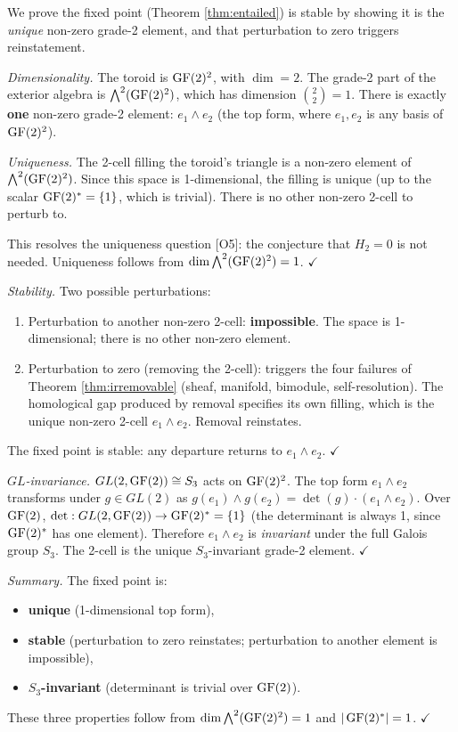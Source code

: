 We prove the fixed point (Theorem \ref{thm:entailed})
is stable by showing it is the \emph{unique} non-zero
grade-2 element, and that perturbation to zero triggers
reinstatement.

\emph{Dimensionality.}
The toroid is $\operatorname{GF}(2)^2$, with $\dim = 2$. The grade-2
part of the exterior algebra is
$\bigwedge^2(\operatorname{GF}(2)^2)$, which has dimension
$\binom{2}{2} = 1$. There is exactly \textbf{one}
non-zero grade-2 element: $e_1 \wedge e_2$ (the top
form, where $e_1, e_2$ is any basis of $\operatorname{GF}(2)^2$).

\emph{Uniqueness.}
The 2-cell filling the toroid's triangle is a non-zero
element of $\bigwedge^2(\operatorname{GF}(2)^2)$. Since this space is
1-dimensional, the filling is unique (up to the scalar
$\operatorname{GF}(2)^* = \{1\}$, which is trivial). There is no
other non-zero 2-cell to perturb to.

This resolves the uniqueness question [O5]: the
conjecture that $H_2 = 0$ is not needed. Uniqueness
follows from $\dim \bigwedge^2(\operatorname{GF}(2)^2) = 1$.
$\checkmark$

\emph{Stability.}
Two possible perturbations:
\begin{enumerate}[label=(\roman*),nosep]
  \item Perturbation to another non-zero 2-cell:
    \textbf{impossible}. The space is 1-dimensional;
    there is no other non-zero element.
  \item Perturbation to zero (removing the 2-cell):
    triggers the four failures of Theorem
    \ref{thm:irremovable} (sheaf, manifold, bimodule,
    self-resolution). The homological gap produced by
    removal specifies its own filling, which is the
    unique non-zero 2-cell $e_1 \wedge e_2$. Removal
    reinstates.
\end{enumerate}
The fixed point is stable: any departure returns to
$e_1 \wedge e_2$. $\checkmark$

\emph{$GL$-invariance.}
$GL(2, \operatorname{GF}(2)) \cong S_3$ acts on $\operatorname{GF}(2)^2$. The top
form $e_1 \wedge e_2$ transforms under $g \in GL(2)$ as
$g(e_1) \wedge g(e_2) = \det(g) \cdot (e_1 \wedge e_2)$.
Over $\operatorname{GF}(2)$, $\det: GL(2, \operatorname{GF}(2)) \to \operatorname{GF}(2)^* = \{1\}$
(the determinant is always 1, since $\operatorname{GF}(2)^*$ has one
element). Therefore $e_1 \wedge e_2$ is \emph{invariant}
under the full Galois group $S_3$. The 2-cell is the
unique $S_3$-invariant grade-2 element. $\checkmark$

\emph{Summary.}
The fixed point is:
\begin{itemize}[nosep]
  \item \textbf{unique} (1-dimensional top form),
  \item \textbf{stable} (perturbation to zero reinstates;
    perturbation to another element is impossible),
  \item \textbf{$S_3$-invariant} (determinant is trivial
    over $\operatorname{GF}(2)$).
\end{itemize}
These three properties follow from $\dim \bigwedge^2
(\operatorname{GF}(2)^2) = 1$ and $|\operatorname{GF}(2)^*| = 1$. $\checkmark$


